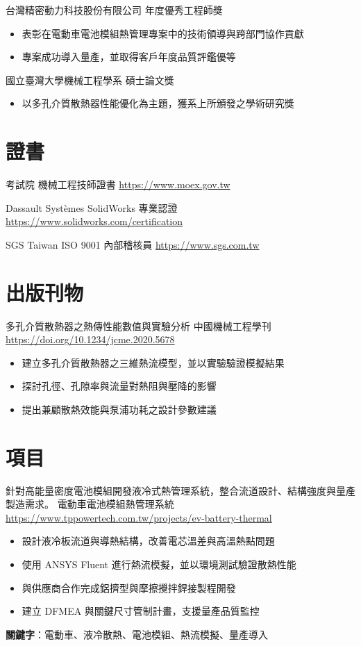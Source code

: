 \documentclass[a4paper, serif, 10pt]{moderncv}
\begin{document}
        {台灣精密動力科技股份有限公司}
        {年度優秀工程師獎}
        {}
        {}
        {\begin{itemize}
\item 表彰在電動車電池模組熱管理專案中的技術領導與跨部門協作貢獻
\item 專案成功導入量產，並取得客戶年度品質評鑑優等
\end{itemize}}

        {國立臺灣大學機械工程學系}
        {碩士論文獎}
        {}
        {}
        {\begin{itemize}
\item 以多孔介質散熱器性能優化為主題，獲系上所頒發之學術研究獎
\end{itemize}}
\section{證書}

        {考試院}
        {機械工程技師證書}
        {\url{https://www.moex.gov.tw}}
        {}
        {}

        {Dassault Systèmes}
        {SolidWorks 專業認證}
        {\url{https://www.solidworks.com/certification}}
        {}
        {}

        {SGS Taiwan}
        {ISO 9001 內部稽核員}
        {\url{https://www.sgs.com.tw}}
        {}
        {}
\section{出版刊物}

        {多孔介質散熱器之熱傳性能數值與實驗分析}
        {中國機械工程學刊}
        {\url{https://doi.org/10.1234/jcme.2020.5678}}
        {}
        {\begin{itemize}
\item 建立多孔介質散熱器之三維熱流模型，並以實驗驗證模擬結果
\item 探討孔徑、孔隙率與流量對熱阻與壓降的影響
\item 提出兼顧散熱效能與泵浦功耗之設計參數建議
\end{itemize}}
\section{項目}

        {針對高能量密度電池模組開發液冷式熱管理系統，整合流道設計、結構強度與量產製造需求。}
        {電動車電池模組熱管理系統}
        {\url{https://www.tppowertech.com.tw/projects/ev-battery-thermal}}
        {}
        {\begin{itemize}
\item 設計液冷板流道與導熱結構，改善電芯溫差與高溫熱點問題
\item 使用 ANSYS Fluent 進行熱流模擬，並以環境測試驗證散熱性能
\item 與供應商合作完成鋁擠型與摩擦攪拌銲接製程開發
\item 建立 DFMEA 與關鍵尺寸管制計畫，支援量產品質監控
\end{itemize}
\textbf{關鍵字}：電動車、液冷散熱、電池模組、熱流模擬、量產導入}
\end{document}
